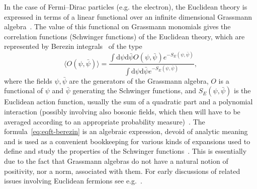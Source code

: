 \documentclass{article}
\newcommand{\mathd}{\mathrm{d}}
\begin{document}
In the case of Fermi--Dirac particles (e.g. the electron), the Euclidean
theory is expressed in terms of a linear functional over an infinite
dimensional Grassmann
algebra~{\cite{schwinger_euclidean_1958,schwinger_euclidean_1959,nakano_quantum_1959,osterwalder_euclidean_1973,osterwalder_euclidean_1973-2}}.
The value of this functional on Grassmann monomials gives the correlation
functions (Schwinger functions) of the Euclidean theory, which are represented
by Berezin integrals~{\cite{Berezin1,Berezin2}} of the type
\begin{equation}
  \langle O (\psi, \bar{\psi}) \rangle = \frac{\int \mathd \psi \mathd
  \bar{\psi} O (\psi, \bar{\psi}) e^{- S_E (\psi, \bar{\psi})}}{\int \mathd
  \psi \mathd \bar{\psi} e^{- S_E (\psi, \bar{\psi})}},
  \label{eq:eqft-berezin}
\end{equation}
where the fields $\psi, \bar{\psi}$ are the generators of the Grassmann
algebra, $O$ is a functional of $\psi$ and $\bar{\psi}$ generating the
Schwinger functions, and $S_E (\psi, \bar{\psi})$ is the Euclidean action
function, usually the sum of a quadratic part and a polynomial interaction
(possibly involving also bosonic fields, which then will have to be averaged
according to an appropriate probability
measure)~{\cite{feldman_renormalizable_1986,disertori_continuous_1998,mastropietro_non-perturbative_2008}}.
The formula~{\eqref{eq:eqft-berezin}} is an algebraic expression, devoid of
analytic meaning and is used as a convenient bookkeeping for various kinds of
expansions used to define and study the properties of the Schwinger
functions~{\cite{rivasseau_perturbative_1991,salmhofer_renormalization,mastropietro_non-perturbative_2008}}.
This is essentially due to the fact that Grassmann algebras do not have a
natural notion of positivity, nor a norm, associated with them. For early
discussions of related issues involving Euclidean fermions see
e.g.~{\cite{frohlich_is_1975,janson_gaussian_1997}}.

\
\end{document}

